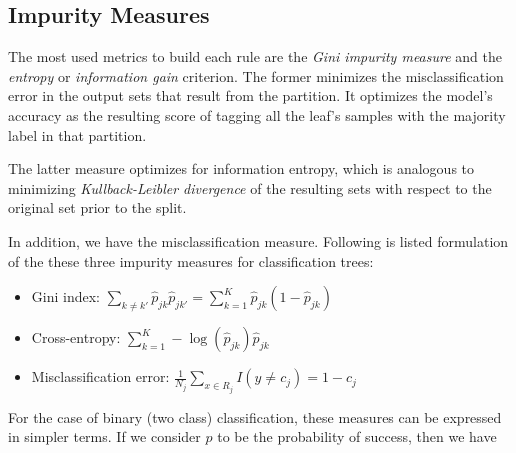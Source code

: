 \smallskip



\subsection{Impurity Measures}\label{subsection:decision_trees_impurity_measures}


The most used metrics to build each rule are the \textit{Gini impurity measure} and the \textit{entropy} or \textit{information gain} criterion.
The former minimizes the misclassification error in the output sets that result from the partition.
It optimizes the model's accuracy as the resulting score of tagging all the leaf's samples with the majority label in that partition.

The latter measure optimizes for information entropy, which is analogous to minimizing \textit{Kullback-Leibler divergence} of the resulting sets with respect to the original set prior to the split.

In addition, we have the misclassification measure.
Following is listed formulation of the these three impurity measures for classification trees:

\begin{itemize}
    \item Gini index: $ \displaystyle \sum_{k\neq k'} \hat{p}_{jk} \hat{p}_{jk'}  = \sum_{k=1}^{K} \hat{p}_{jk} (1 - \hat{p}_{jk}) $
    \item Cross-entropy: $ \displaystyle \sum_{k=1}^{K} -\log(\hat{p}_{jk})\hat{p}_{jk} $
    \item Misclassification error: $ \displaystyle \frac{1}{N_j} \sum_{x \in R_j} I(y\neq c_j) = 1 - c_j $
\end{itemize}


For the case of binary (two class) classification, these measures can be expressed in simpler terms.
If we consider $p$ to be the probability of success, then we have

